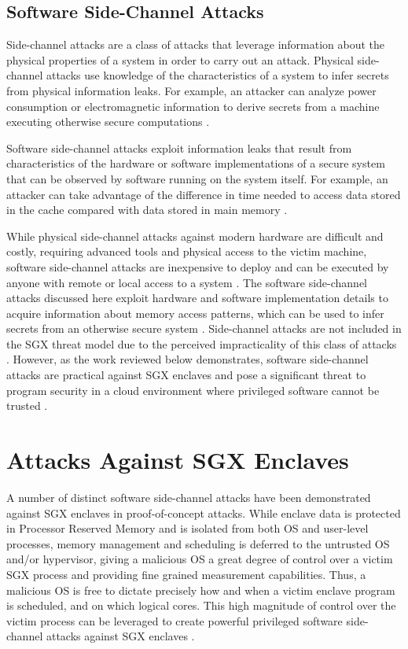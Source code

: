 \subsection{Software Side-Channel Attacks}

Side-channel attacks are a class of attacks that leverage information about the physical properties of a system in order to carry out an attack. Physical side-channel attacks use knowledge of the characteristics of a system to infer secrets from physical information leaks. For example, an attacker can analyze power consumption or electromagnetic information to derive secrets from a machine executing otherwise secure computations \cite{standaert_introduction_2010}. 

Software side-channel attacks exploit information leaks that result from characteristics of the hardware or software implementations of a secure system that can be observed by software running on the system itself. For example, an attacker can take advantage of the difference in time needed to access data stored in the cache compared with data stored in main memory \cite{costan_intel_2016}. 

While physical side-channel attacks against modern hardware are difficult and costly, requiring advanced tools and physical access to the victim machine, software side-channel attacks are inexpensive to deploy and can be executed by anyone with remote or local access to a system \cite{costan_intel_2016}. The software side-channel attacks discussed here exploit hardware and software implementation details to acquire information about memory access patterns, which can be used to infer secrets from an otherwise secure system \cite{gotzfried_cache_2017, schwarz_malware_2017, xu_controlled-channel_2015, shinde_preventing_2015}. Side-channel attacks are not included in the SGX threat model due to the perceived impracticality of this class of attacks \cite{intel_corporation_intel_2016, costan_intel_2016}. However, as the work reviewed below demonstrates, software side-channel attacks are practical against SGX enclaves and pose a significant threat to program security in a cloud environment where privileged software cannot be trusted \cite{moghimi_cachezoom:_2017, intel_corporation_tutorial_2015}.

\section{Attacks Against SGX Enclaves}

A number of distinct software side-channel attacks have been demonstrated against SGX enclaves in proof-of-concept attacks. While enclave data is protected in Processor Reserved Memory and is isolated from both OS and user-level processes, memory management and scheduling is deferred to the untrusted OS and/or hypervisor, giving a malicious OS a great degree of control over a victim SGX process and providing fine grained measurement capabilities. Thus, a malicious OS is free to dictate precisely how and when a victim enclave program is scheduled, and on which logical cores. This high magnitude of control over the victim process can be leveraged to create powerful privileged software side-channel attacks against SGX enclaves \cite{costan_intel_2016}. 

